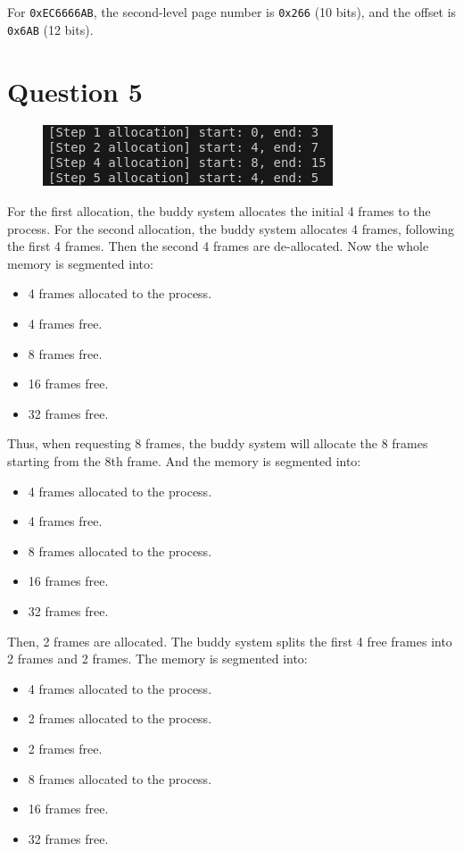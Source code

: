 \documentclass[a4paper,12pt]{article}
\begin{document}
For \texttt{0xEC6666AB}, the second-level page number is \texttt{0x266} (10 bits), and the offset is \texttt{0x6AB} (12 bits).

\section*{Question 5}

\begin{figure}[H]
	\centering
	\includegraphics[width=0.8\linewidth]{figure/buddy.png}
\end{figure}

For the first allocation, the buddy system allocates the initial 4 frames to the process. For the second allocation, the buddy system allocates 4 frames, following the first 4 frames. Then the second 4 frames are de-allocated. Now the whole memory is segmented into:
\begin{itemize}
	\item 4 frames allocated to the process.
	\item 4 frames free.
	\item 8 frames free.
	\item 16 frames free.
	\item 32 frames free.
\end{itemize}

Thus, when requesting 8 frames, the buddy system will allocate the 8 frames starting from the 8th frame. And the memory is segmented into:
\begin{itemize}
	\item 4 frames allocated to the process.
	\item 4 frames free.
	\item 8 frames allocated to the process.
	\item 16 frames free.
	\item 32 frames free.
\end{itemize}

Then, 2 frames are allocated. The buddy system splits the first 4 free frames into 2 frames and 2 frames. The memory is segmented into:
\begin{itemize}
	\item 4 frames allocated to the process.
	\item 2 frames allocated to the process.
	\item 2 frames free.
	\item 8 frames allocated to the process.
	\item 16 frames free.
	\item 32 frames free.
\end{itemize}
\end{document}
